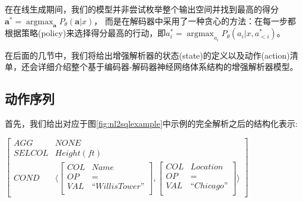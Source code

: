 在在线生成期间，我们的模型并非尝试枚举整个输出空间并找到最高的得分$\boldsymbol{a}^{*} = \mathop{\arg\max}_{\boldsymbol{a}} P_{\theta}(\boldsymbol{a}|x)$，
而是在解码器中采用了一种贪心的方法：在每一步都根据策略(policy)来选择得分最高的行动，即$a^{*}_{i} = \mathop{\arg\max}_{a_{i}} P_{\theta}(a_{i}|x,a^{*}_{<i})$。

在后面的几节中，我们将给出增强解析器的状态(state)的定义以及动作(action)清单，还会详细介绍整个基于编码器-解码器神经网络体系结构的增强解析器模型。


\subsection{动作序列}
\label{enl2sql:dzxl}

首先，我们给出对应于图\ref{fig:nl2sqlexample}中示例的完全解析之后的结构化表示:
  

$\begin{bmatrix}
  AGG    &  NONE  \\
  SELCOL &  Height(ft) \\
  COND   &   \langle
    \begin{bmatrix}
      COL  &  Name \\
      OP   &  =    \\
      VAL  &  “Willis Tower”\\
    \end{bmatrix}
    ,
    \begin{bmatrix}
      COL  &  Location \\
      OP   &  =    \\
      VAL  &  “Chicago”\\
    \end{bmatrix}
    \rangle
  \end{bmatrix}$

